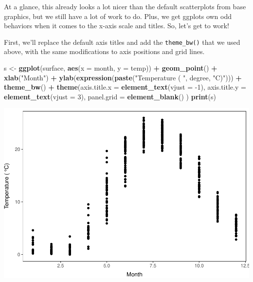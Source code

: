 \documentclass[
]{book}
\newenvironment{Shaded}{\begin{snugshade}}{\end{snugshade}}
\newcommand{\DataTypeTok}[1]{\textcolor[rgb]{0.13,0.29,0.53}{#1}}
\newcommand{\DecValTok}[1]{\textcolor[rgb]{0.00,0.00,0.81}{#1}}
\newcommand{\KeywordTok}[1]{\textcolor[rgb]{0.13,0.29,0.53}{\textbf{#1}}}
\newcommand{\NormalTok}[1]{#1}
\newcommand{\OperatorTok}[1]{\textcolor[rgb]{0.81,0.36,0.00}{\textbf{#1}}}
\newcommand{\StringTok}[1]{\textcolor[rgb]{0.31,0.60,0.02}{#1}}
\begin{document}
At a glance, this already looks a lot nicer than the default scatterplots from base graphics, but we still have a lot of work to do. Plus, we get ggplots own odd behaviors when it comes to the x-axis scale and titles. So, let's get to work!

First, we'll replace the default axis titles and add the \texttt{theme\_bw()} that we used above, with the same modifications to axis positions and grid lines.

\begin{Shaded}
\begin{Highlighting}[]
\NormalTok{s <-}\StringTok{ }\KeywordTok{ggplot}\NormalTok{(surface, }\KeywordTok{aes}\NormalTok{(}\DataTypeTok{x =}\NormalTok{ month, }\DataTypeTok{y =}\NormalTok{ temp)) }\OperatorTok{+}
\StringTok{  }\KeywordTok{geom_point}\NormalTok{() }\OperatorTok{+}\StringTok{ }
\StringTok{  }\KeywordTok{xlab}\NormalTok{(}\StringTok{"Month"}\NormalTok{) }\OperatorTok{+}
\StringTok{  }\KeywordTok{ylab}\NormalTok{(}\KeywordTok{expression}\NormalTok{(}\KeywordTok{paste}\NormalTok{(}\StringTok{"Temperature ( "}\NormalTok{, degree, }\StringTok{"C)"}\NormalTok{))) }\OperatorTok{+}
\StringTok{  }\KeywordTok{theme_bw}\NormalTok{() }\OperatorTok{+}
\StringTok{  }\KeywordTok{theme}\NormalTok{(}\DataTypeTok{axis.title.x =} \KeywordTok{element_text}\NormalTok{(}\DataTypeTok{vjust =} \DecValTok{-1}\NormalTok{),}
        \DataTypeTok{axis.title.y =} \KeywordTok{element_text}\NormalTok{(}\DataTypeTok{vjust =} \DecValTok{3}\NormalTok{),}
        \DataTypeTok{panel.grid =} \KeywordTok{element_blank}\NormalTok{()}
\NormalTok{  )}
\KeywordTok{print}\NormalTok{(s)}
\end{Highlighting}
\end{Shaded}

\includegraphics{worstr_files/figure-latex/unnamed-chunk-105-1.pdf}
\end{document}

